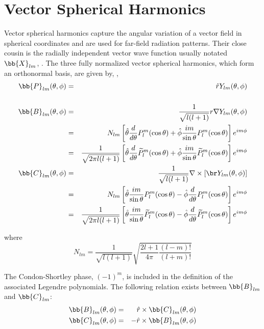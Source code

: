 {\footnotesize
{}
}

\clearpage

\section{Vector Spherical Harmonics}
\label{sec:vecsphharm}
Vector spherical harmonics capture the angular variation of a vector field in spherical coordinates and are used for far-field radiation patterns. Their close cousin is the radially independent vector wave function usually notated $\bb{X}_{lm}$, \cite{jackson1999classical}. The three fully normalized vector spherical harmonics, which form an orthonormal basis, are given by, \cite{chew1995waves, tsang2000scattering}, 
\begin{eqnarray}
\bb{P}_{lm}(\theta,\phi) &=& \hat{r}Y_{lm}(\theta,\phi) \\
\  & \ & \nonumber \\
\bb{B}_{lm}(\theta,\phi) &=&\dfrac{1}{\sqrt{ l(l+1)}} r\nabla Y_{lm}(\theta,\phi)  \\
\ &=& N_{lm} \left[\hat\theta \dfrac{d}{d\theta} P_l^m(\cos\theta) + \hat\phi \dfrac{im}{\sin\theta}P_l^m(\cos\theta) \right] e^{im\phi}   \\
\ &=& \dfrac{1}{\sqrt{2\pi l(l+1)}} \left[\hat\theta \dfrac{d}{d\theta} \widetilde{P}_l^m(\cos\theta) + \hat\phi \dfrac{im}{\sin\theta}\widetilde{P}_l^m(\cos\theta) \right] e^{im\phi}  \\
\bb{C}_{lm}(\theta,\phi) &=& \dfrac{1}{\sqrt{ l(l+1)}} \nabla \times \left[ \br Y_{lm}(\theta,\phi) \right] \\
\ &=& N_{lm} \left[\hat\theta \dfrac{im}{\sin\theta}P_l^m(\cos\theta) - \hat\phi \dfrac{d}{d\theta} P_l^m(\cos\theta)  \right] e^{im\phi}  \\
\ &=& \dfrac{1}{\sqrt{2\pi l(l+1)}}  \left[\hat\theta \dfrac{im}{\sin\theta}\widetilde{P}_l^m(\cos\theta) - \hat\phi \dfrac{d}{d\theta} \widetilde{P}_l^m(\cos\theta)  \right] e^{im\phi} 
\end{eqnarray}

\noindent where
\begin{equation}
N_{lm} = \dfrac{1}{\sqrt{l(l+1)}}\sqrt{\dfrac{2l+1}{4\pi}\dfrac{(l-m)!}{(l+m)!}}
\end{equation}

The Condon-Shortley phase, $(-1)^m$, is included in the definition of the associated Legendre polynomials. The following relation exists between $\bb{B}_{lm}$ and $\bb{C}_{lm}$:
\begin{eqnarray}
\bb{B}_{lm}(\theta,\phi) &=& \hat{r} \times \bb{C}_{lm}(\theta,\phi) \\
\bb{C}_{lm}(\theta,\phi) &=& -\hat{r} \times \bb{B}_{lm}(\theta,\phi) 
\end{eqnarray}


